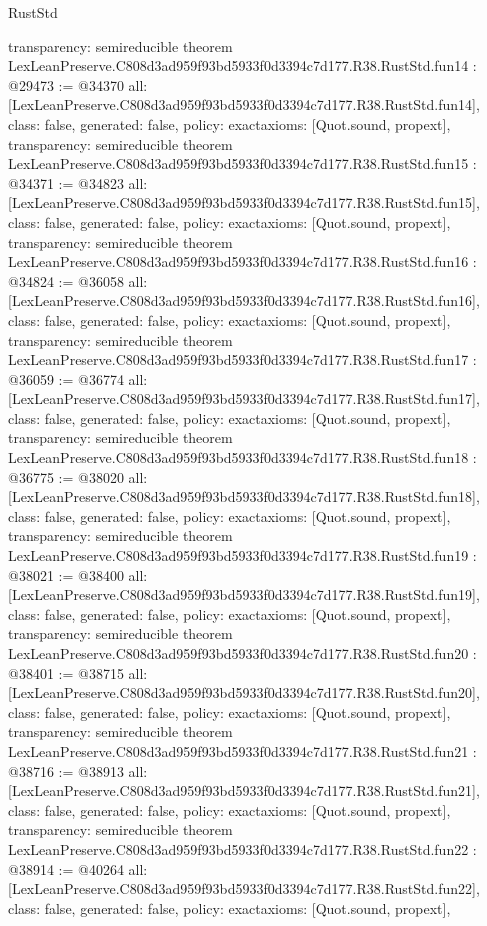 \begin{lexlean}{RustStd}
\begin{coremodule}
{  transparency: semireducible
}
theorem LexLeanPreserve.C808d3ad959f93bd5933f0d3394c7d177.R38.RustStd.fun14 : @29473 := @34370 {
  all: [LexLeanPreserve.C808d3ad959f93bd5933f0d3394c7d177.R38.RustStd.fun14],
  class: false,
  generated: false,
  policy: exact{axioms: [Quot.sound, propext]},
  transparency: semireducible
}
theorem LexLeanPreserve.C808d3ad959f93bd5933f0d3394c7d177.R38.RustStd.fun15 : @34371 := @34823 {
  all: [LexLeanPreserve.C808d3ad959f93bd5933f0d3394c7d177.R38.RustStd.fun15],
  class: false,
  generated: false,
  policy: exact{axioms: [Quot.sound, propext]},
  transparency: semireducible
}
theorem LexLeanPreserve.C808d3ad959f93bd5933f0d3394c7d177.R38.RustStd.fun16 : @34824 := @36058 {
  all: [LexLeanPreserve.C808d3ad959f93bd5933f0d3394c7d177.R38.RustStd.fun16],
  class: false,
  generated: false,
  policy: exact{axioms: [Quot.sound, propext]},
  transparency: semireducible
}
theorem LexLeanPreserve.C808d3ad959f93bd5933f0d3394c7d177.R38.RustStd.fun17 : @36059 := @36774 {
  all: [LexLeanPreserve.C808d3ad959f93bd5933f0d3394c7d177.R38.RustStd.fun17],
  class: false,
  generated: false,
  policy: exact{axioms: [Quot.sound, propext]},
  transparency: semireducible
}
theorem LexLeanPreserve.C808d3ad959f93bd5933f0d3394c7d177.R38.RustStd.fun18 : @36775 := @38020 {
  all: [LexLeanPreserve.C808d3ad959f93bd5933f0d3394c7d177.R38.RustStd.fun18],
  class: false,
  generated: false,
  policy: exact{axioms: [Quot.sound, propext]},
  transparency: semireducible
}
theorem LexLeanPreserve.C808d3ad959f93bd5933f0d3394c7d177.R38.RustStd.fun19 : @38021 := @38400 {
  all: [LexLeanPreserve.C808d3ad959f93bd5933f0d3394c7d177.R38.RustStd.fun19],
  class: false,
  generated: false,
  policy: exact{axioms: [Quot.sound, propext]},
  transparency: semireducible
}
theorem LexLeanPreserve.C808d3ad959f93bd5933f0d3394c7d177.R38.RustStd.fun20 : @38401 := @38715 {
  all: [LexLeanPreserve.C808d3ad959f93bd5933f0d3394c7d177.R38.RustStd.fun20],
  class: false,
  generated: false,
  policy: exact{axioms: [Quot.sound, propext]},
  transparency: semireducible
}
theorem LexLeanPreserve.C808d3ad959f93bd5933f0d3394c7d177.R38.RustStd.fun21 : @38716 := @38913 {
  all: [LexLeanPreserve.C808d3ad959f93bd5933f0d3394c7d177.R38.RustStd.fun21],
  class: false,
  generated: false,
  policy: exact{axioms: [Quot.sound, propext]},
  transparency: semireducible
}
theorem LexLeanPreserve.C808d3ad959f93bd5933f0d3394c7d177.R38.RustStd.fun22 : @38914 := @40264 {
  all: [LexLeanPreserve.C808d3ad959f93bd5933f0d3394c7d177.R38.RustStd.fun22],
  class: false,
  generated: false,
  policy: exact{axioms: [Quot.sound, propext]},
}
\end{coremodule}
\end{lexlean}
